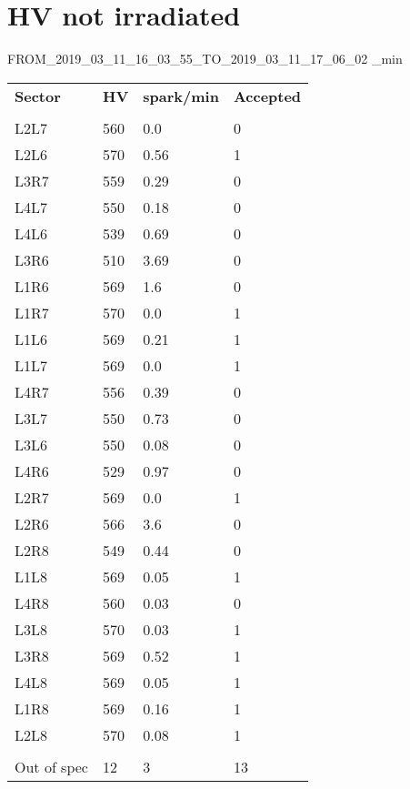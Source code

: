 \documentclass{article}%
\begin{document}
\section*{HV not irradiated}%
\label{sec:HV not irradiated}%
\newline%
%
FROM\_2019\_03\_11\_16\_03\_55\_TO\_2019\_03\_11\_17\_06\_02%
\_min%
\linebreak%
\renewcommand{\arraystretch}{1.5}%
\begin{longtabu}{X[l] X[r] X[r] X[r]}%
%
\textbf{Sector}&\textbf{HV}&\textbf{spark/min}&\textbf{Accepted}\\%
&&&\\%
\hline%
%
L2L7&560&0.0&0\\%
L2L6&570&0.56&1\\%
%
L3R7&559&0.29&0\\%
L4L7&550&0.18&0\\%
%
L4L6&539&0.69&0\\%
L3R6&510&3.69&0\\%
%
L1R6&569&1.6&0\\%
L1R7&570&0.0&1\\%
%
L1L6&569&0.21&1\\%
L1L7&569&0.0&1\\%
%
L4R7&556&0.39&0\\%
L3L7&550&0.73&0\\%
%
L3L6&550&0.08&0\\%
L4R6&529&0.97&0\\%
%
L2R7&569&0.0&1\\%
L2R6&566&3.6&0\\%
%
L2R8&549&0.44&0\\%
L1L8&569&0.05&1\\%
%
L4R8&560&0.03&0\\%
L3L8&570&0.03&1\\%
%
L3R8&569&0.52&1\\%
L4L8&569&0.05&1\\%
%
L1R8&569&0.16&1\\%
L2L8&570&0.08&1\\%
&&&\\%
\hline%
Out of spec&12&3&13\\%
\end{longtabu}
\end{document}
